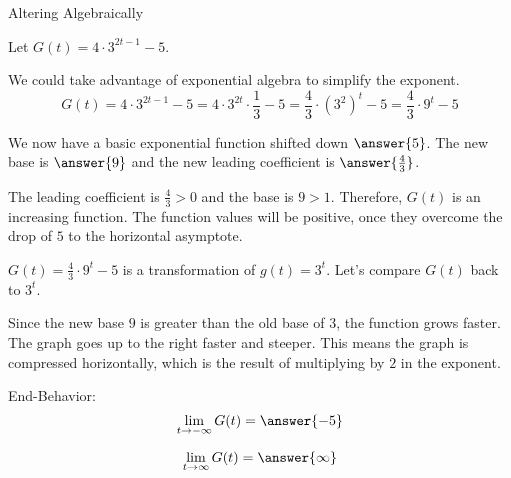 \documentclass{ximera}
\begin{document}
\begin{example} Altering Algebraically



Let $G(t) = 4 \cdot 3^{2t-1} - 5$.  

We could take advantage of exponential algebra to simplify the exponent.   \\

\[ 
G(t) = 4 \cdot 3^{2t-1} - 5 = 4 \cdot 3^{2t} \cdot \frac{1}{3} - 5 = \frac{4}{3} \cdot (3^2)^t - 5  = \frac{4}{3} \cdot 9^t - 5
\]


We now have a basic exponential function shifted down $\answer{5}$.  The new base is $\answer{9}$ and the new leading coefficient is $\answer{\frac{4}{3}}$.




The leading coefficient is $\frac{4}{3} > 0$ and the base is $9 > 1$. Therefore, $G(t)$ is an increasing function.  The function values will be positive, once they overcome the drop of $5$ to the horizontal asymptote.



$G(t) = \frac{4}{3} \cdot 9^t - 5$ is a transformation of $g(t) = 3^t$.  Let's compare $G(t)$ back to $3^t$.


Since the new base $9$ is greater than the old base of $3$, the function grows faster.  The graph goes up to the right faster and steeper.  This means the graph is compressed horizontally, which is the result of multiplying by $2$ in the exponent.





End-Behavior:
\[
\lim\limits_{t \to -\infty}G(t) = \answer{-5}  
\]

\[
\lim\limits_{t \to \infty}G(t) = \answer{\infty}
\]




\end{example}
\end{document}

